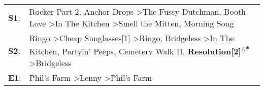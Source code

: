 \begin{supertabular}{p{0.03\textwidth}p{0.92\textwidth}}
 \textbf{S1}:  &                                                                                                     Rocker Part 2\textsuperscript{}, \enspace Anchor Drops\textsuperscript{} \textgreater \enspace The Fussy Dutchman\textsuperscript{}, \enspace Booth Love\textsuperscript{} \textgreater \enspace In The Kitchen\textsuperscript{} \textgreater \enspace Smell the Mitten\textsuperscript{}, \enspace Morning Song\textsuperscript{}  \enspace  \\
 \textbf{S2}:  &  Ringo\textsuperscript{} \textgreater \enspace Cheap Sunglasses[1]\textsuperscript{} \textgreater \enspace Ringo\textsuperscript{}, \enspace Bridgeless\textsuperscript{} \textgreater \enspace In The Kitchen\textsuperscript{}, \enspace Partyin' Peeps\textsuperscript{}, \enspace Cemetery Walk II\textsuperscript{}, \enspace \textbf{Resolution[2]\textsuperscript{$\wedge$*}} \textgreater \enspace Bridgeless\textsuperscript{}  \enspace  \\
 \textbf{E1}:  &                                                                                                                                                                                                                                                                                                         Phil's Farm\textsuperscript{} \textgreater \enspace Lenny\textsuperscript{} \textgreater \enspace Phil's Farm\textsuperscript{}  \enspace  \\
\end{supertabular}
